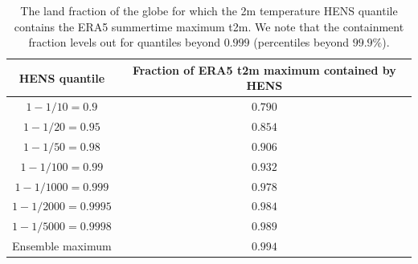 \documentclass{article}
\begin{document}
\begin{table}[!h]
    \centering
    \begin{tabular}{c c}
 \hline
\textbf{HENS quantile} & \textbf{Fraction of ERA5 t2m maximum contained by HENS} \\ \hline
      $1 - 1/10 = 0.9$   &         $0.790$ \\
     $1 - 1/20 = 0.95$   &         $0.854$ \\
     $1 - 1/50 = 0.98$   &         $0.906$ \\
    $1 - 1/100 = 0.99$   &         $0.932$ \\
  $1 - 1/1000 = 0.999$   &         $0.978$ \\
 $1 - 1/2000 = 0.9995$   &         $0.984$ \\ 
 $1 - 1/5000 = 0.9998$   &         $0.989$ \\
Ensemble maximum & $0.994$ \\ \hline
    \end{tabular}
    \caption{The land fraction of the globe for which the 2m temperature HENS quantile contains the ERA5 summertime maximum t2m. We note that the containment fraction levels out for quantiles beyond $0.999$ (percentiles beyond $99.9\%$).}
    \label{tab:henscontain}
\end{table}


\clearpage


\end{document}
